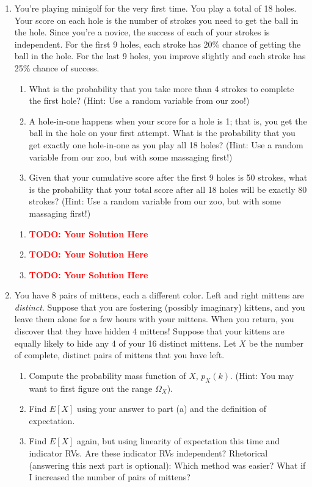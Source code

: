 \documentclass[12pt]{article}
\def\todo#1{\textcolor{red}{\textbf{#1}}}
\renewcommand{\|}{\mid}
\begin{document}
\begin{enumerate}
    \item You’re playing minigolf for the very first time. You play a total of 18 holes. Your score on each hole is the number of strokes you need to get the ball in the hole. Since you’re a novice, the success of each of your strokes is independent. For the first 9 holes, each stroke has 20\% chance of getting the ball in the hole. For the last 9 holes, you improve slightly and each stroke has 25\% chance of success.
    \begin{enumerate}
        \item What is the probability that you take more than 4 strokes to complete the first hole? (Hint: Use a random variable from our zoo!)
        \item A hole-in-one happens when your score for a hole is 1; that is, you get the ball in the hole on your first attempt. What is the probability that you get exactly one hole-in-one as you play all 18 holes? (Hint: Use a random variable from our zoo, but with some massaging first!)
        \item Given that your cumulative score after the first 9 holes is 50 strokes, what is the probability that your total score after all 18 holes will be exactly 80 strokes? (Hint: Use a random variable from our zoo, but with some massaging first!)
    \end{enumerate}
    
\begin{tcolorbox}
\begin{enumerate}
\item \todo{TODO: Your Solution Here}
\item \todo{TODO: Your Solution Here}
\item \todo{TODO: Your Solution Here}
\end{enumerate}
\end{tcolorbox}
    
    \item You have 8 pairs of mittens, each a different color. Left and right mittens are \textit{distinct}. Suppose
that you are fostering (possibly imaginary) kittens, and you leave them alone for a few hours with
your mittens. When you return, you discover that they have hidden 4 mittens! Suppose that your
kittens are equally likely to hide any 4 of your 16 distinct mittens. Let $X$ be the number of complete,
distinct pairs of mittens that you have left.
\begin{enumerate}
    \item Compute the probability mass function of $X$, $p_X(k)$. (Hint: You may want to first figure out the range $\Omega_X$).
    \item Find $E[X]$ using your answer to part (a) and the definition of expectation.
    \item Find $E[X]$ again, but using linearity of expectation this time and indicator RVs. Are these indicator RVs independent? Rhetorical (answering this next part is optional): Which method was easier? What if I increased the number of pairs of mittens?
\end{enumerate}


\end{enumerate}
\end{document}
